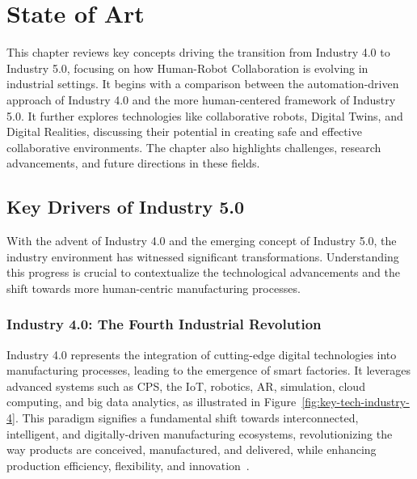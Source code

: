 \chapter{State of Art}
\label{chapter:stateofart}

\begin{introduction}
    This chapter reviews key concepts driving the transition from Industry 4.0 to Industry 5.0, focusing on how Human-Robot Collaboration is evolving in industrial settings. It begins with a comparison between the automation-driven approach of Industry 4.0 and the more human-centered framework of Industry 5.0. It further explores technologies like collaborative robots, Digital Twins, and Digital Realities, discussing their potential in creating safe and effective collaborative environments. The chapter also highlights challenges, research advancements, and future directions in these fields.
\end{introduction}



\section{Key Drivers of Industry 5.0}
\label{section:industry-evolution}
With the advent of Industry 4.0 and the emerging concept of Industry 5.0, the industry environment has witnessed significant transformations. Understanding this progress is crucial to contextualize the technological advancements and the shift towards more human-centric manufacturing processes.

\subsection{Industry 4.0: The Fourth Industrial Revolution}

Industry 4.0 represents the integration of cutting-edge digital technologies into manufacturing processes, leading to the emergence of smart factories. It leverages advanced systems such as \ac{CPS}, the \ac{IoT}, robotics, \ac{AR}, simulation, cloud computing, and big data analytics, as illustrated in Figure~\ref{fig:key-tech-industry-4}. This paradigm signifies a fundamental shift towards interconnected, intelligent, and digitally-driven manufacturing ecosystems, revolutionizing the way products are conceived, manufactured, and delivered, while enhancing production efficiency, flexibility, and innovation~\cite{Moller2022, Ahmed2022}.

